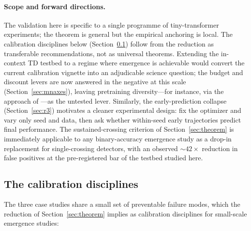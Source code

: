 \documentclass[11pt]{article}
\theoremstyle{plain}
\theoremstyle{definition}
\begin{document}
\paragraph{Scope and forward directions.}
The validation here is specific to a single programme of tiny-transformer experiments; the
theorem is general but the empirical anchoring is local.
The calibration disciplines below (Section~\ref{sec:disciplines}) follow from the reduction
as transferable recommendations, not as universal theorems.
Extending the in-context TD testbed to a regime where emergence is achievable would
convert the current calibration vignette into an adjudicable science question; the
budget and discount levers are now answered in the negative at this scale
(Section~\ref{sec:mnaxes}), leaving pretraining diversity---for instance, via the
approach of \citet{lee2023icrl}---as the untested lever.
Similarly, the early-prediction collapse (Section~\ref{sec:r3}) motivates a cleaner experimental
design: fix the optimizer and vary only seed and data, then ask whether within-seed
early trajectories predict final performance.
The sustained-crossing criterion of Section~\ref{sec:theorem} is immediately applicable to
any binary-accuracy emergence study as a drop-in replacement for single-crossing
detectors, with an observed ${\sim}42\times$ reduction in false positives at the
pre-registered bar of the testbed studied here.

\subsection{The calibration disciplines}\label{sec:disciplines}

The three case studies share a small set of preventable failure modes, which the reduction
of Section~\ref{sec:theorem} implies as calibration disciplines for small-scale emergence
studies:
\end{document}

